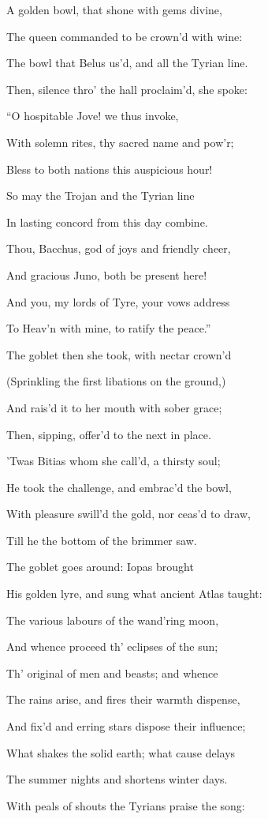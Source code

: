 A golden bowl, that shone with gems divine,

The queen commanded to be crown’d with wine:

The bowl that Belus us’d, and all the Tyrian line.

Then, silence thro’ the hall proclaim’d, she spoke:

“O hospitable Jove! we thus invoke,

With solemn rites, thy sacred name and pow’r;

Bless to both nations this auspicious hour!

So may the Trojan and the Tyrian line

In lasting concord from this day combine.

Thou, Bacchus, god of joys and friendly cheer,

And gracious Juno, both be present here!

And you, my lords of Tyre, your vows address

To Heav’n with mine, to ratify the peace.”

The goblet then she took, with nectar crown’d

(Sprinkling the first libations on the ground,)

And rais’d it to her mouth with sober grace;

Then, sipping, offer’d to the next in place.

’Twas Bitias whom she call’d, a thirsty soul;

He took the challenge, and embrac’d the bowl,

With pleasure swill’d the gold, nor ceas’d to draw,

Till he the bottom of the brimmer saw.

The goblet goes around: Iopas brought

His golden lyre, and sung what ancient Atlas taught:

The various labours of the wand’ring moon,

And whence proceed th’ eclipses of the sun;

Th’ original of men and beasts; and whence

The rains arise, and fires their warmth dispense,

And fix’d and erring stars dispose their influence;

What shakes the solid earth; what cause delays

The summer nights and shortens winter days.

With peals of shouts the Tyrians praise the song:

